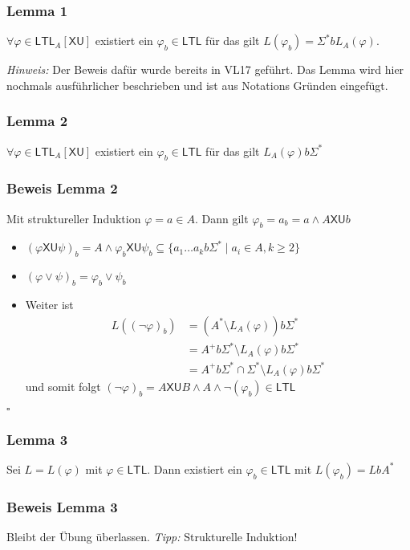 \documentclass[12pt, german]{article}
\newcommand{\sigstern}{\Sigma^\ast}
\newcommand{\aast}{A^{\ast}}
\newcommand{\ltl}{\mathsf{LTL}}
\newcommand{\sX}{\mathsf{X}}
\newcommand{\sU}{\mathsf{U}}
\newcommand{\bewiesen}{
	
	\begin{flushright}
		$\square$  \\
\end{flushright}}
\begin{document}
\subsubsection{Lemma 1}
	 $\forall \varphi \in \ltl_A[\sX\sU]$ existiert ein $\varphi_b \in \ltl$ für das gilt $L(\varphi_b) = \sigstern b L_A(\varphi)$.
	 \newline

	\textit{Hinweis: }Der Beweis dafür wurde bereits in VL17 geführt. Das Lemma wird hier nochmals ausführlicher beschrieben und ist aus Notations Gründen eingefügt. 

\subsubsection{Lemma 2}
	 $\forall \varphi \in \ltl_A[\sX\sU]$ existiert ein  $\varphi_b \in \ltl$ für das gilt $L_A(\varphi)b \sigstern$

\subsubsection{Beweis Lemma 2}
	Mit struktureller Induktion $\varphi = a \in A$. Dann gilt $\varphi_b = a_b = a \land A \sX \sU b$
	\begin{itemize}
		\item $(\varphi \sX \sU \psi)_b = A \land \varphi_b \sX\sU\psi_b \subseteq \{a_1\ldots a_kb\sigstern \mid a_i \in A, k \geq 2\}$
		\item $(\varphi \lor \psi)_b = \varphi_b \lor \psi_b$ 
		\item Weiter ist 
		\begin{align*}
			L((\neg \varphi)_b) &= (\aast \setminus L_A(\varphi))b\sigstern \\
			&= A^+b\sigstern \setminus L_A(\varphi)b\sigstern \\
			&=A^+b\sigstern \cap \sigstern \setminus L_A(\varphi)b\sigstern
		\end{align*} und somit folgt $(\neg \varphi)_b = A \sX\sU B \land A \land \neg (\varphi_b) \in \ltl$
	\end{itemize}
\bewiesen

\subsubsection{Lemma 3}
	Sei $L = L(\varphi)$ mit $\varphi \in \ltl$. Dann existiert ein $\varphi_b \in \ltl$ mit $L(\varphi_b) = Lb\aast$

\subsubsection{Beweis Lemma 3}
	Bleibt der Übung überlassen. \textit{Tipp: } Strukturelle Induktion!
\end{document}
